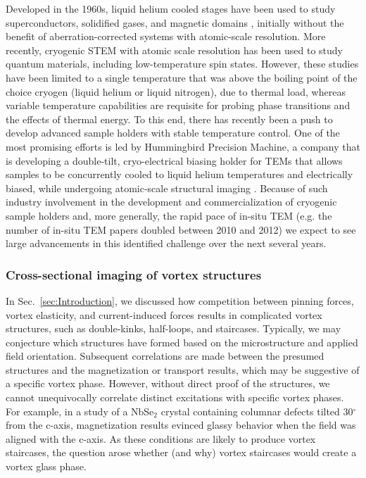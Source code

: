 \documentclass[%
 aip,
 amsmath,amssymb,
 reprint,%
floatfix]{revtex4-1}
\begin{document}
Developed in the 1960s, liquid helium cooled stages have been used to study superconductors, solidified gases, and magnetic domains \cite{goodge_2020}, initially without the benefit of aberration-corrected systems with atomic-scale resolution.  More recently, cryogenic STEM with atomic scale resolution has been used to study quantum materials, including low-temperature spin states.  However, these studies have been limited to a single temperature that was above the boiling point of the choice cryogen (liquid helium or liquid nitrogen)\cite{goodge_2020}, due to thermal load, whereas variable temperature capabilities are requisite for probing phase transitions and the effects of thermal energy.  To this end, there has recently been a push to develop advanced sample holders with stable temperature control\cite{goodge_2020, HummingbirdSBIR}.  One of the most promising efforts is led by Hummingbird Precision Machine, a company that is developing a double-tilt, cryo-electrical biasing holder for TEMs that allows samples to be concurrently cooled to liquid helium temperatures and electrically biased, while undergoing atomic-scale structural imaging \cite{HummingbirdSBIR}.  Because of such industry involvement in the development and commercialization of cryogenic sample holders and, more generally, the rapid pace of in-situ TEM (e.g. the number of in-situ TEM papers doubled between 2010 and 2012\cite{Taheri2016}) we expect to see large advancements in this identified challenge over the next several years.



\subsubsection{Cross-sectional imaging of vortex structures}

In Sec.~\ref{sec:Introduction}, we discussed how competition between pinning forces, vortex elasticity, and current-induced forces results in complicated vortex structures, such as double-kinks, half-loops, and staircases. Typically, we may conjecture which structures have formed based on the microstructure and applied field orientation. Subsequent correlations are made between the presumed structures and the magnetization or transport results, which may be suggestive of a specific vortex phase. However, without direct proof of the structures, we cannot unequivocally correlate distinct excitations with specific vortex phases. For example, in a study of a NbSe$_2$ crystal containing columnar defects tilted 30$^\circ$ from the c-axis, magnetization results evinced glassy behavior when the field was aligned with the c-axis\cite{Eley2018}.  As these conditions are likely to produce vortex staircases, the question arose whether (and why) vortex staircases would create a vortex glass phase.
\end{document}
